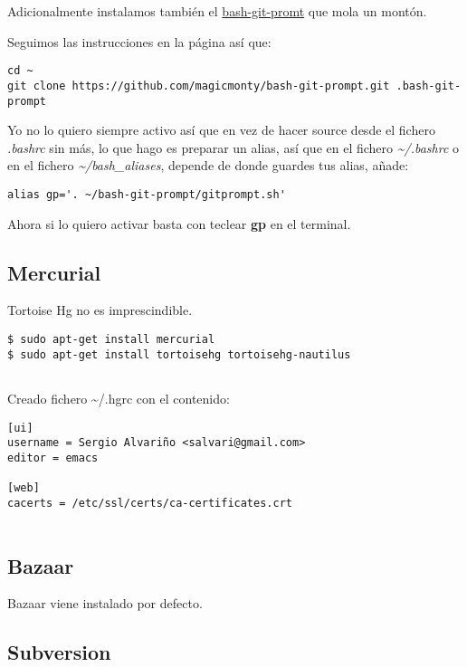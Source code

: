 Adicionalmente instalamos también el
\href{https://github.com/magicmonty/bash-git-prompt}{bash-git-promt} que
mola un montón.

Seguimos las instrucciones en la página así que:

\begin{verbatim}
cd ~
git clone https://github.com/magicmonty/bash-git-prompt.git .bash-git-prompt
\end{verbatim}

Yo no lo quiero siempre activo así que en vez de hacer source desde el
fichero \emph{.bashrc} sin más, lo que hago es preparar un alias, así
que en el fichero \emph{\textasciitilde{}/.bashrc} o en el fichero
\emph{\textasciitilde{}/bash\_aliases}, depende de donde guardes tus
alias, añade:

\begin{verbatim}
alias gp='. ~/bash-git-prompt/gitprompt.sh'
\end{verbatim}

Ahora si lo quiero activar basta con teclear \textbf{gp} en el terminal.

\subsection{Mercurial}\label{mercurial}

Tortoise Hg no es imprescindible.

\begin{verbatim}
$ sudo apt-get install mercurial
$ sudo apt-get install tortoisehg tortoisehg-nautilus
      
\end{verbatim}

Creado fichero \textasciitilde{}/.hgrc con el contenido:

\begin{verbatim}
[ui]
username = Sergio Alvariño <salvari@gmail.com>
editor = emacs

[web]
cacerts = /etc/ssl/certs/ca-certificates.crt
      
\end{verbatim}

\subsection{Bazaar}\label{bazaar}

Bazaar viene instalado por defecto.

\subsection{Subversion}\label{subversion}

